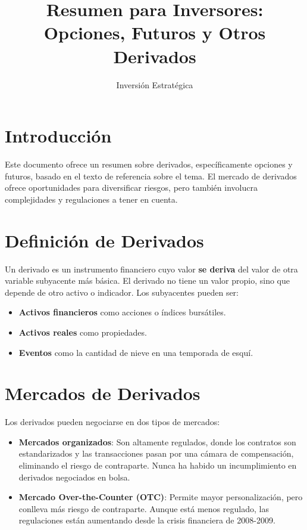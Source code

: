 \documentclass{article}
\title{Resumen para Inversores: Opciones, Futuros y Otros Derivados}
\author{Inversión Estratégica}
\begin{document}
\maketitle

\section*{Introducción}

Este documento ofrece un resumen sobre derivados, específicamente opciones y futuros, basado en el texto de referencia sobre el tema. El mercado de derivados ofrece oportunidades para diversificar riesgos, pero también involucra complejidades y regulaciones a tener en cuenta.

\section*{Definición de Derivados}

Un derivado es un instrumento financiero cuyo valor \textbf{se deriva} del valor de otra variable subyacente más básica. El derivado no tiene un valor propio, sino que depende de otro activo o indicador. Los subyacentes pueden ser:

\begin{itemize}
    \item \textbf{Activos financieros} como acciones o índices bursátiles.
    \item \textbf{Activos reales} como propiedades.
    \item \textbf{Eventos} como la cantidad de nieve en una temporada de esquí.
\end{itemize}

\section*{Mercados de Derivados}

Los derivados pueden negociarse en dos tipos de mercados:

\begin{itemize}
    \item \textbf{Mercados organizados}: Son altamente regulados, donde los contratos son estandarizados y las transacciones pasan por una cámara de compensación, eliminando el riesgo de contraparte. Nunca ha habido un incumplimiento en derivados negociados en bolsa.
    \item \textbf{Mercado Over-the-Counter (OTC)}: Permite mayor personalización, pero conlleva más riesgo de contraparte. Aunque está menos regulado, las regulaciones están aumentando desde la crisis financiera de 2008-2009.
\end{itemize}
\end{document}
